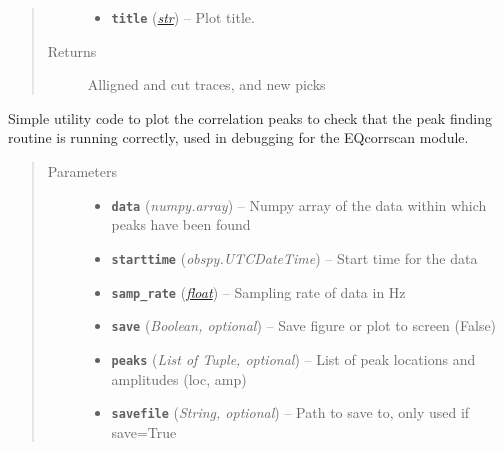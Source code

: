 \documentclass[a4paper,10pt,english]{sphinxmanual}
\begin{document}
\begin{fulllineitems}
\begin{quote}
\begin{description}
\begin{itemize}
\item {} 
\textbf{\texttt{title}} (\href{https://docs.python.org/library/functions.html\#str}{\emph{str}}) -- Plot title.

\end{itemize}

\item[{Returns}] \leavevmode
Alligned and cut traces, and new picks

\end{description}\end{quote}

\end{fulllineitems}


\begin{fulllineitems}
\label{submodules/utils.EQcorrscan_plotting:EQcorrscan_plotting.peaks_plot}
Simple utility code to plot the correlation peaks to check that the peak
finding routine is running correctly, used in debugging for the EQcorrscan
module.
\begin{quote}\begin{description}
\item[{Parameters}] \leavevmode\begin{itemize}
\item {} 
\textbf{\texttt{data}} (\emph{numpy.array}) -- Numpy array of the data within which peaks have been found

\item {} 
\textbf{\texttt{starttime}} (\emph{obspy.UTCDateTime}) -- Start time for the data

\item {} 
\textbf{\texttt{samp\_rate}} (\href{https://docs.python.org/library/functions.html\#float}{\emph{float}}) -- Sampling rate of data in Hz

\item {} 
\textbf{\texttt{save}} (\emph{Boolean, optional}) -- Save figure or plot to screen (False)

\item {} 
\textbf{\texttt{peaks}} (\emph{List of Tuple, optional}) -- List of peak locations and amplitudes (loc, amp)

\item {} 
\textbf{\texttt{savefile}} (\emph{String, optional}) -- Path to save to, only used if save=True

\end{itemize}

\end{description}\end{quote}

\end{fulllineitems}
\end{document}
